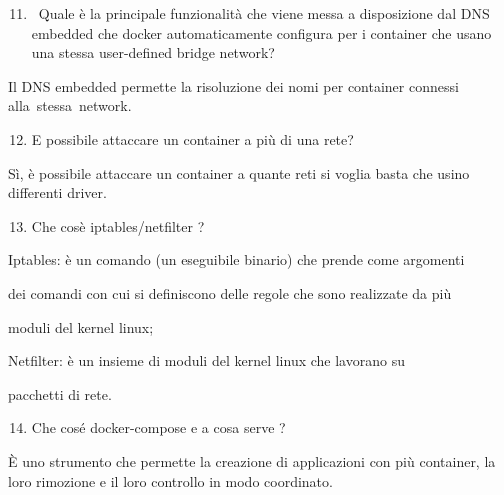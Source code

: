 \documentclass[
]{article}
\providecommand{\tightlist}{%
  \setlength{\itemsep}{0pt}\setlength{\parskip}{0pt}}
\begin{document}
\begin{enumerate}
\setcounter{enumi}{10}
\tightlist
\item
  {~Quale è la principale funzionalità che viene messa a disposizione
  dal DNS embedded che docker automaticamente configura per i container
  che usano una stessa user-defined bridge network?}
\end{enumerate}

{}

{Il DNS embedded permette la risoluzione dei nomi per container connessi
}{alla}{~}{stessa}{~network.}

{}

{}

\begin{enumerate}
\setcounter{enumi}{11}
\tightlist
\item
  {E\textquotesingle{} possibile attaccare un container a più di una
  rete?}
\end{enumerate}

{}

{Sì, è possibile attaccare un container a quante reti si voglia basta
che usino differenti driver.}

{}

{}

\begin{enumerate}
\setcounter{enumi}{12}
\tightlist
\item
  {Che cos\textquotesingle è iptables/netfilter ?}
\end{enumerate}

{}

{Iptables: è un comando (un eseguibile binario) che prende come
argomenti }

{dei comandi con cui si definiscono delle regole che sono realizzate da
più }

{moduli del kernel linux;}

{}

{Netfilter: è un insieme di moduli del kernel linux che lavorano su }

{pacchetti di rete.}

{}

{}

\begin{enumerate}
\setcounter{enumi}{13}
\tightlist
\item
  {Che cos\textquotesingle é docker-compose e a cosa serve ?}
\end{enumerate}

{}

{È uno strumento che permette la creazione di applicazioni con più
container, la loro rimozione e il loro controllo in modo coordinato.}
\end{document}
